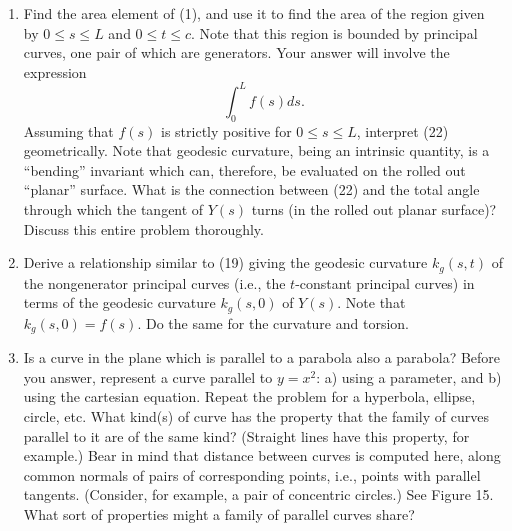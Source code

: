 \documentclass{book}
\begin{document}
\begin{enumerate}
  \item Find the area element of (1), and use it to find the area of the region given by $0 \leq s \leq L$ and $0 \leq t \leq c$. Note that this region is bounded by principal curves, one pair of which are generators. Your answer will involve the expression
    \begin{equation}
      \int_{0}^{L} f(s) ds.
    \end{equation}
    Assuming that $f(s)$ is strictly positive for $0 \leq s \leq L$, interpret (22) geometrically. Note that geodesic curvature, being an intrinsic quantity, is a ``bending'' invariant which can, therefore, be evaluated on the rolled out ``planar'' surface. What is the connection between (22) and the total angle through which the tangent of $Y(s)$ turns (in the rolled out planar surface)? Discuss this entire problem thoroughly.
  \item Derive a relationship similar to (19) giving the geodesic curvature $k_{g}(s,t)$ of the nongenerator principal curves (i.e., the $t$-constant principal curves) in terms of the geodesic curvature $k_{g}(s,0)$ of $Y(s)$. Note that $k_{g}(s,0) = f(s)$. Do the same for the curvature and torsion.
  \item Is a curve in the plane which is parallel to a parabola also a parabola? Before you answer, represent a curve parallel to $y = x^{2}$: a) using a parameter, and b) using the cartesian equation. Repeat the problem for a hyperbola, ellipse, circle, etc. What kind(s) of curve has the property that the family of curves parallel to it are of the same kind? (Straight lines have this property, for example.) Bear in mind that distance between curves is computed here, along common normals of pairs of corresponding points, i.e., points with parallel tangents. (Consider, for example, a pair of concentric circles.) See Figure 15. What sort of properties might a family of parallel curves share?


\end{enumerate}
\end{document}
